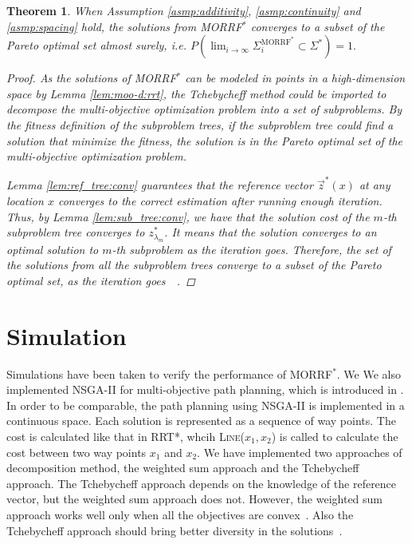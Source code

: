 \documentclass[conference]{IEEEtran}
\newtheorem{thm}{Theorem}
\begin{document}
\begin{thm}
\label{thm:morrt:conv}
When Assumption \ref{asmp:additivity}, \ref{asmp:continuity} and \ref{asmp:spacing} hold,
the solutions from MORRF$^{*} $ converges to a subset of the Pareto optimal set almost surely, i.e.
$
P( \lim_{ i \rightarrow \infty }  \Sigma^{\mbox{MORRF}^{*}}_{i}  \subset \Sigma^{*} ) = 1.
$
\begin{proof}
As the solutions of MORRF$^{*}$ can be modeled in points in a high-dimension space by Lemma \ref{lem:moo-d:rrt}, the Tchebycheff method could be imported to decompose the multi-objective optimization problem into a set of subproblems.
By the fitness definition of the subproblem trees, if the subproblem tree could find a solution that minimize the fitness, the solution is in the Pareto optimal set of the multi-objective optimization problem.

Lemma \ref{lem:ref_tree:conv} guarantees that the reference vector $ \vec{z}^{*}(x) $ at any location $ x $ converges to the correct estimation after running enough iteration.
Thus, by Lemma \ref{lem:sub_tree:conv}, we have that the solution cost of the $ m $-th subproblem tree converges to $ z^{*}_{ \lambda_{m} } $.
It means that the solution converges to an optimal solution to $ m $-th subproblem as the iteration goes.
Therefore, the set of the solutions from all the subproblem trees converge to a subset of the Pareto optimal set, as the iteration goes~\cite{4358754}~\cite{miettinen1999nonlinear}.
\end{proof}
\end{thm}

\section{Simulation}
\label{sec:simulation}

Simulations have been taken to verify the performance of MORRF$^{*}$.
We 
We also implemented NSGA-II for multi-objective path planning, which is introduced in \cite{Ahmed2013}.
In order to be comparable, the path planning using NSGA-II is implemented in a continuous space.
Each solution is represented as a sequence of way points.
The cost is calculated like that in RRT*, whcih \textsc{Line}($ x_{1}, x_{2} $) is called to calculate the cost between two way points $ x_{1} $ and $ x_{2} $.
We have implemented two approaches of decomposition method, the weighted sum approach and the Tchebycheff approach.
The Tchebycheff approach depends on the knowledge of the reference vector, but the weighted sum approach does not.
However, the weighted sum approach works well only when all the objectives are convex~\cite{4358754}.
Also the Tchebycheff approach should bring better diversity in the solutions~\cite{4358754}.
\end{document}
